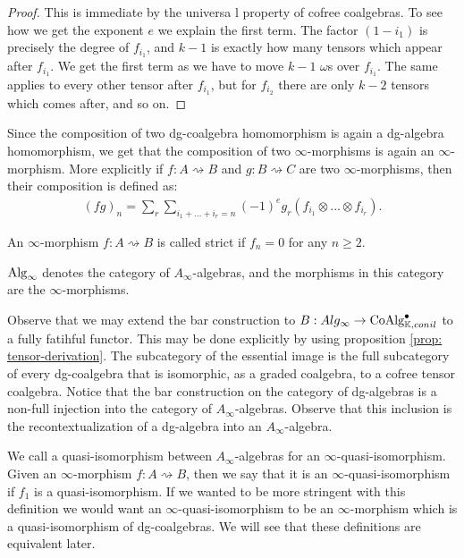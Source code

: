\documentclass[../thesis.tex]{subfiles}
\begin{document}
        \begin{proof}
            This is immediate by the universa l property of cofree coalgebras. To see how we get the exponent $e$ we explain the first term. The factor $(1 - i_1)$ is precisely the degree of $f_{i_1}$, and $k-1$ is exactly how many tensors which appear after $f_{i_1}$. We get the first term as we have to move $k-1$ $\omega$s over $f_{i_1}$. The same applies to every other tensor after $f_{i_1}$, but for $f_{i_2}$ there are only $k-2$ tensors which comes after, and so on.
        \end{proof}

        Since the composition of two dg-coalgebra homomorphism is again a dg-algebra homomorphism, we get that the composition of two $\infty$-morphisms is again an $\infty$-morphism. More explicitly if $f:A\rightsquigarrow B$ and $g: B\rightsquigarrow C$ are two $\infty$-morphisms, then their composition is defined as:
        \begin{align*}
            (fg)_n = \sum_r\sum_{i_1 + ... + i_r = n} (-1)^eg_r(f_{i_1}\otimes ... \otimes f_{i_r})\text{.}
        \end{align*}

        \begin{definition}
            An $\infty$-morphism $f: A\rightsquigarrow B$ is called strict if $f_n = 0$ for any $n\geq 2$. 
        \end{definition}

        \begin{definition}
            $\tt{Alg}_\infty$ denotes the category of $A_\infty$-algebras, and the morphisms in this category are the $\infty$-morphisms.
        \end{definition}

        Observe that we may extend the bar construction to $B : Alg_\infty \rightarrow \tt{Co\tt{Alg}}_{\mathbb{K},conil}^\bullet$ to a fully fatihful functor. This may be done explicitly by using proposition \ref{prop: tensor-derivation}. The subcategory of the essential image is the full subcategory of every dg-coalgebra that is isomorphic, as a graded coalgebra, to a cofree tensor coalgebra. Notice that the bar construction on the category of dg-algebras is a non-full injection into the category of $A_\infty$-algebras. Observe that this inclusion is the recontextualization of a dg-algebra into an $A_\infty$-algebra.

        We call a quasi-isomorphism between $A_\infty$-algebras for an $\infty$-quasi-isomorphism. Given an $\infty$-morphism $f: A\rightsquigarrow B$, then we say that it is an $\infty$-quasi-isomorphism if $f_1$ is a quasi-isomorphism. If we wanted to be more stringent with this definition we would want an $\infty$-quasi-isomorphism to be an $\infty$-morphism which is a quasi-isomorphism of dg-coalgebras. We will see that these definitions are equivalent later.
\end{document}
